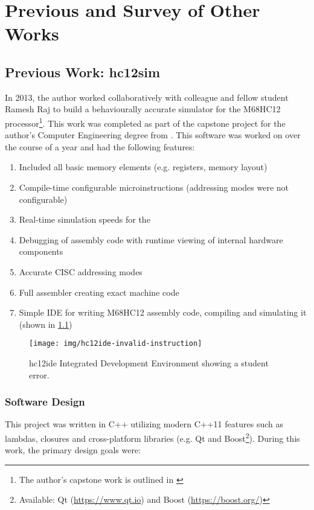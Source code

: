 \chapter{Previous and Survey of Other Works}
\label{ch:prev-other-work}

\section{Previous Work: hc12sim}
\label{sec:review-prev-hc12}

In 2013, the author worked collaboratively with colleague and fellow student Ramesh Raj to build a behaviourally accurate simulator for the M68HC12 processor\footnote{The author's capstone work is outlined in \cite{Brightwell2013}}. This work was completed as part of the capstone project for the author's Computer Engineering degree from \uwo{}. This software was worked on over the course of a year and had the following features: 

\begin{enumerate}
    \item Included all basic memory elements (e.g. registers, memory layout)
    \item Compile-time configurable microinstructions (addressing modes were not configurable)
    \item Real-time simulation speeds for the \hcmodel{}
    \item Debugging of assembly code with runtime viewing of internal hardware components
    \item Accurate CISC addressing modes 
    \item Full assembler creating exact machine code
    \item Simple IDE for writing M68HC12 assembly code, compiling and simulating it (shown in \cref{fig:hc12ide-invalid-instruction})
\end{enumerate}

\begin{figure}[!ht]
    \centering
    \texttt{[image: img/hc12ide-invalid-instruction]}
    \caption{hc12ide Integrated Development Environment showing a student error.}
    \label{fig:hc12ide-invalid-instruction}
\end{figure}

\subsection{Software Design}

This project was written in C++ utilizing modern C++11 features such as lambdas, closures and cross-platform libraries (e.g. Qt and Boost\footnote{Available: Qt (\url{https://www.qt.io}) and Boost (\url{https://boost.org/})}). During this work, the primary design goals were: 

